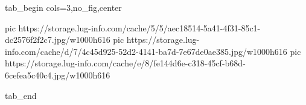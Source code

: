  
 
 
 
 


\ifcmt
  tab_begin cols=3,no_fig,center

     pic https://storage.lug-info.com/cache/5/5/aec18514-5a41-4f31-85c1-dc2576f2f2c7.jpg/w1000h616%
		 pic https://storage.lug-info.com/cache/d/7/4c45d925-52d2-4141-ba7d-7e67de0ae385.jpg/w1000h616%
		 pic https://storage.lug-info.com/cache/e/8/fe144d6e-c318-45cf-b68d-6cefea5c40c4.jpg/w1000h616%

  tab_end
\fi
